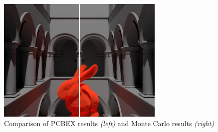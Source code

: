 \documentclass[10pt,compress,professionalfont]{beamer}
\begin{document}
\begin{frame}[c]{}

    {\centering
    \includegraphics[width=80mm]{../img/compare}\\
    }
    {\centering\scriptsize Comparison of PCBEX results \textit{(left)} and Monte Carlo results \textit{(right)}\\}

\end{frame}
\end{document}
